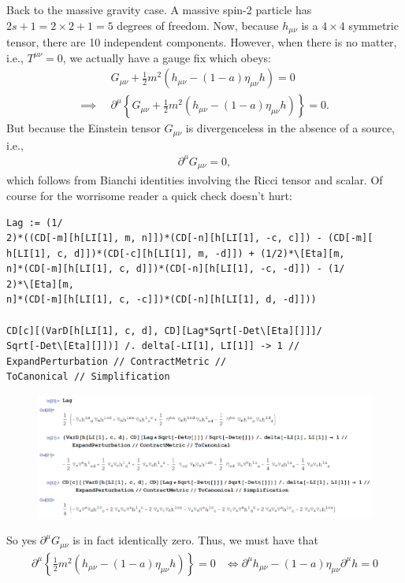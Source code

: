 \documentclass{book}
\theoremstyle{definition}
\newcommand{\p}{\partial}
\newcommand{\nn}{\nonumber}
\newcommand{\f}[2]{\frac{#1}{#2}}
\newcommand{\lp}{\left(}
\newcommand{\rp}{\right)}
\newcommand{\lc}{\left\{}
\newcommand{\rc}{\right\}}
\begin{document}
Back to the massive gravity case. A massive spin-2 particle has $2s+1 = 2\times 2 + 1 = 5$ degrees of freedom. Now, because $h_{\mu\nu}$ is a $4\times 4$ symmetric tensor, there are 10 independent components. However, when there is no matter, i.e., $T^{\mu\nu} = 0$, we actually have a gauge fix which obeys:
\begin{align}\label{gauge-fix}
&G_{\mu\nu} + \f{1}{2}m^2 \lp h_{\mu\nu} - (1-a)\eta_{\mu\nu}h \rp = 0\nn\\
\implies\,\,\, &\p^\mu \lc G_{\mu\nu} + \f{1}{2}m^2 \lp h_{\mu\nu} - (1-a)\eta_{\mu\nu}h \rp \rc = 0.
\end{align}
But because the Einstein tensor $G_{\mu\nu}$ is divergenceless in the absence of a source, i.e.,
\begin{align}
\p^\mu G_{\mu\nu} = 0,
\end{align}
which follows from Bianchi identities involving the Ricci tensor and scalar. Of course for the worrisome reader a quick check doesn't hurt:
\begin{lstlisting}
Lag := (1/
2)*((CD[-m][h[LI[1], m, n]])*(CD[-n][h[LI[1], -c, c]]) - (CD[-m][
h[LI[1], c, d]])*(CD[-c][h[LI[1], m, -d]]) + (1/2)*\[Eta][m, 
n]*(CD[-m][h[LI[1], c, d]])*(CD[-n][h[LI[1], -c, -d]]) - (1/
2)*\[Eta][m, 
n]*(CD[-m][h[LI[1], c, -c]])*(CD[-n][h[LI[1], d, -d]]))

CD[c][(VarD[h[LI[1], c, d], CD][Lag*Sqrt[-Det\[Eta][]]]/
Sqrt[-Det\[Eta][]])] /. delta[-LI[1], LI[1]] -> 1 // 
ExpandPerturbation // ContractMetric // 
ToCanonical // Simplification
\end{lstlisting}
\begin{figure}[!htb]
	\includegraphics[scale=0.25]{CDG}
\end{figure}
So yes $\p^\mu G_{\mu\nu}$ is in fact identically zero. Thus, we must have that
\begin{align}\label{gauge-1}
\p^\mu \lc \f{1}{2}m^2 \lp h_{\mu\nu} - (1-a)\eta_{\mu\nu}h \rp \rc= 0 &\iff \boxed{\p^\mu h_{\mu\nu} - (1-a)\eta_{\mu\nu}\p^\mu h = 0}
\end{align}
\end{document}

